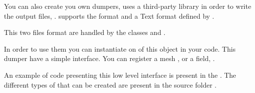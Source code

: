 You can also create you own dumpers, \akantu uses a third-party library in order
to write the output files, . \akantu supports the 
format and a Text format defined by .

This two files format are handled by the classes
 and
.

In order to use them you can instantiate on of this object in your code. This
dumper have a simple interface. You can register a mesh
,
 or a field,
.

An example of code presenting this low level interface is present in the
. The different types of  that can
be created are present in the source folder .

